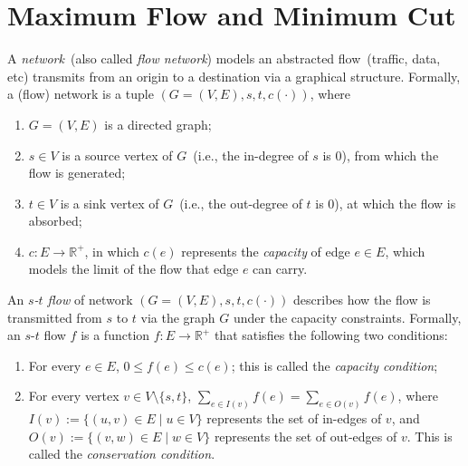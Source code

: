 \setcounter{definition}{0} \setcounter{property}{0} \setcounter{claim}{0} \setcounter{fact}{0} \setcounter{corollary}{0} \setcounter{figure}{0}
\section{Maximum Flow and Minimum Cut}

A \emph{network}~(also called \emph{flow network}) models 
an abstracted flow~(traffic, data, etc) transmits from an origin to a destination
via a graphical structure. Formally, a (flow) network is a tuple $(G = (V, E), s, t, c(\cdot))$, where

\vspace*{-\topsep}
\begin{enumerate}
\item $G = (V, E)$ is a directed graph;
\item $s\in V$ is a source vertex of $G$~(i.e., the in-degree of $s$ is 0), from which the flow is generated;
\item $t\in V$ is a sink vertex of $G$~(i.e., the out-degree of $t$ is 0), at which the flow is absorbed;
\item $c: E\to \mathbb{R}^+$, in which $c(e)$ represents the \emph{capacity} of edge $e\in E$, which models the limit of the flow that edge $e$ can carry.
\end{enumerate}

An \emph{$s$-$t$ flow} of network $(G = (V, E), s, t, c(\cdot))$
describes {how} the flow is transmitted from $s$ to $t$
via the graph $G$ under the capacity constraints. Formally,
an $s$-$t$ flow $f$ is a function $f: E\to \mathbb{R}^+$
that satisfies the following two conditions:
\vspace*{-\topsep}
\begin{enumerate}
\item For every $e\in E$, $0\le f(e) \le c(e)$; this is called the \emph{capacity condition};
\item For every vertex $v\in V\setminus\{s,t\}$, $\sum_{e\in I(v)} f(e) = \sum_{e\in O(v)} f(e)$, where $I(v) := \{(u,v)\in E\mid u\in V\}$ represents
the set of in-edges of $v$, and $O(v) := \{(v,w)\in E\mid w\in V\}$ represents
the set of out-edges of $v$. This is called the \emph{conservation condition}.
\end{enumerate}

